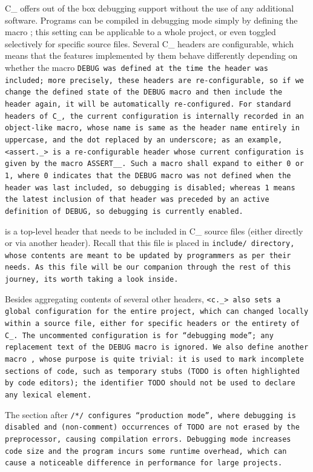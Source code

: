 C\_ offers out of the box debugging support
without the use of any additional software.
Programs can be compiled in debugging mode simply by defining the
macro ; this setting can be applicable to a whole project,
or even toggled selectively for specific source files.
Several C\_ headers are configurable,
which means that the features implemented by them behave differently depending
on whether the macro \tt{DEBUG} was defined at the time the header was included;
more precisely, these headers are re-configurable, so if we change the
\tt{defined} state of the \tt{DEBUG} macro and then include the header again,
it will be automatically re-configured.
For standard headers of C\_,
the current configuration is internally recorded in an object-like macro,
whose name is same as the header name entirely in uppercase,
and the dot replaced by an underscore;
as an example, \tt{<assert._>} is a re-configurable header
whose current configuration is given by the macro \tt{ASSERT__}.
Such a macro shall expand to either 0 or 1,
where 0 indicates that the \tt{DEBUG} macro was not defined
when the header was last included, so debugging is disabled;
whereas 1 means the latest inclusion of that header was preceded by
an active definition of \tt{DEBUG}, so debugging is currently enabled.

 is a top-level header that needs to be included in
C\_ source files (either directly or via another header).
Recall that this file is placed in \tt{include/} directory,
whose contents are meant to be updated by programmers as per their needs.
As this file will be our companion through the rest of this journey,
its worth taking a look inside.


Besides aggregating contents of several other headers,
\tt{<c._>} also sets a global configuration for the entire project,
which can changed locally within a source file,
either for specific headers or the entirety of C\_.
The uncommented configuration is for ``debugging mode'';
any replacement text of the \tt{DEBUG} macro is ignored.
We also define another macro , whose purpose is quite trivial:
it is used to mark incomplete sections of code, such as temporary stubs
(\tt{TODO} is often highlighted by code editors);
the identifier \tt{TODO} should not be used to declare any lexical element.

The section after \tt{/*/} configures ``production mode'', where debugging is
disabled and (non-comment) occurrences of \tt{TODO} are
not erased by the preprocessor, causing compilation errors.
Debugging mode increases code size and the program incurs some runtime overhead,
which can cause a noticeable difference in performance for large projects.

